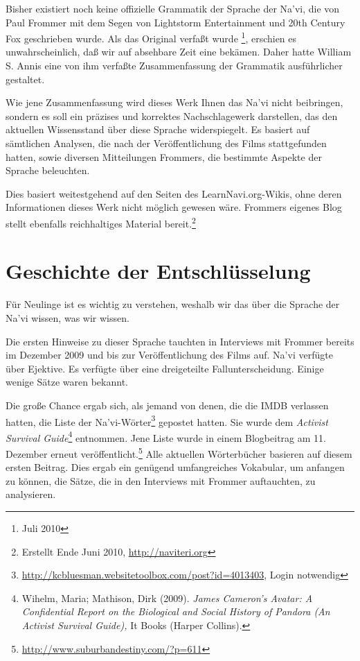 
Bisher existiert noch keine offizielle Grammatik der Sprache der Na’vi,
die von Paul Frommer mit dem Segen von Lightstorm Entertainment und 20th
Century Fox geschrieben wurde. Als das Original verfa\ss{}t wurde
\footnote{Juli 2010}, erschien es unwahrscheinlich, da\ss{} wir auf
absehbare Zeit eine bek\"amen. Daher hatte William S. Annis eine von ihm
verfa\ss{}te Zusammenfassung der Grammatik ausf\"uhrlicher gestaltet.

Wie jene Zusammenfassung wird dieses Werk Ihnen das Na’vi nicht beibringen,
sondern es soll ein pr\"azises und korrektes Nachschlagewerk darstellen,
das den aktuellen Wissensstand \"uber diese Sprache widerspiegelt. Es 
basiert auf s\"amtlichen Analysen, die nach der Ver\"offentlichung des
Films stattgefunden hatten, sowie diversen Mitteilungen Frommers, die
bestimmte Aspekte der Sprache beleuchten.

Dies basiert weitestgehend auf den Seiten des LearnNavi.org-Wikis, ohne
deren Informationen dieses Werk nicht m\"oglich gewesen w\"are. Frommers
eigenes Blog stellt ebenfalls reichhaltiges Material
bereit.\footnote{Erstellt Ende Juni 2010, \url{http://naviteri.org}}


\section{Geschichte der Entschl\"usselung}
F\"ur Neulinge ist es wichtig zu verstehen, weshalb wir das \"uber die
Sprache der Na’vi wissen, was wir wissen.

Die ersten Hinweise zu dieser Sprache tauchten in Interviews mit Frommer
bereits im Dezember 2009 und bis zur Ver\"offentlichung des Films auf.
Na’vi verf\"ugte \"uber Ejektive. Es verf\"ugte \"uber eine dreigeteilte
Fallunterscheidung. Einige wenige S\"atze waren bekannt.

Die gro\ss{}e Chance ergab sich, als jemand von denen, die die IMDB
verlassen hatten, die Liste der Na’vi-W\"orter\footnote{\url{
http://kcbluesman.websitetoolbox.com/post?id=4013403}, Login notwendig}
gepostet hatten. Sie wurde dem \textit{Activist Survival Guide}\footnote{
Wihelm, Maria; Mathison, Dirk (2009). \textit{James Cameron’s Avatar: A
Confidential Report on the Biological and Social History of Pandora (An
Activist Survival Guide),} It Books (Harper Collins).} entnommen.
Jene Liste wurde in einem Blogbeitrag am 11. Dezember erneut
ver\"offentlicht.\footnote{\url{http://www.suburbandestiny.com/?p=611}}
Alle aktuellen W\"orterb\"ucher basieren auf diesem ersten Beitrag. Dies
ergab ein gen\"ugend umfangreiches Vokabular, um anfangen zu k\"onnen,
die S\"atze, die in den Interviews mit Frommer auftauchten, zu analysieren.


